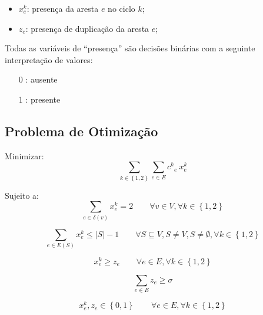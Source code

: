 \documentclass{article}
\newcommand{\Set}[1]{\ensuremath{\left\{#1\right\}}}
\newcommand{\Sum}[1]{\ensuremath{\displaystyle\sum\limits_{#1}}}
\newcommand{\abs}[1]{\ensuremath{\left| #1 \right|}}
\newcommand{\binary}{\ensuremath{\Set{0, 1}}}
\newcommand{\edge}{\ensuremath{e}}
\newcommand{\edges}{\ensuremath{E}}
\newcommand{\vertex}{\ensuremath{v}}
\newcommand{\vertices}{\ensuremath{V}}
\newcommand{\ncycles}{2}
\newcommand{\allCycles}{\ensuremath{\Set{1, \ncycles}}}
\newcommand{\cycle}{\ensuremath{k}}
\newcommand{\subvertices}{\ensuremath{S}}
\newcommand{\cost}[1]{\ensuremath{c^{#1}}}
\newcommand{\costke}{\ensuremath{\cost{\cycle}_{\edge}}}
\newcommand{\X}[2]{\ensuremath{x^{#1}_{#2}}}
\newcommand{\xke}{\ensuremath{\X{\cycle}{\edge}}}
\newcommand{\ze}{\ensuremath{z_{\edge}}}
\newcommand{\similarity}{\ensuremath{\sigma}}
\begin{document}
\begin{itemize}
	\item $\xke$: presença da aresta $\edge$ no ciclo $\cycle$;
	\item $\ze$: presença de duplicação da aresta $\edge$;
\end{itemize}

Todas as variáveis de ``presença'' são decisões binárias com a seguinte interpretação de valores:

\begin{itemize}
	\item[0]: ausente
	\item[1]: presente
\end{itemize}

\subsection{Problema de Otimização}
\label{subsec:problem}

Minimizar:
\begin{equation}
    \label{eq:goal}
 	\Sum{\cycle \in \allCycles}
 	\Sum{\edge \in \edges} 	
 	\costke \ \xke 	
\end{equation}

Sujeito a:
\begin{equation}
	\label{constraint:vertex presence}
	\Sum{\edge \in \delta(\vertex)} \xke = 2
	\qquad
	\forall \vertex \in \vertices,
	\forall \cycle \in \allCycles
\end{equation}

\begin{equation}
	\label{constraint:no subcycle}
	\Sum{\edge \in \edges(\subvertices)} \xke \leqslant \abs{\subvertices} - 1
	\qquad
	\forall
		\subvertices \subseteq \vertices,
		\subvertices \neq \vertices,
		\subvertices \neq \emptyset,
		\forall \cycle \in \allCycles
\end{equation}

\begin{equation}
	\label{constraint:similarity compatibility}
	\xke \geqslant \ze
	\qquad
	\forall \edge \in \edges,
	\forall \cycle \in \allCycles
\end{equation}

\begin{equation}
	\label{constraint:similarity}
	\Sum{\edge \in \edges} \ze \geqslant \similarity
\end{equation}

\begin{equation}
	\label{constraint:binary variables}
	\xke, \ze \in \binary
	\qquad
	\forall \edge \in \edges,
	\forall \cycle \in \allCycles
\end{equation}
\end{document}

